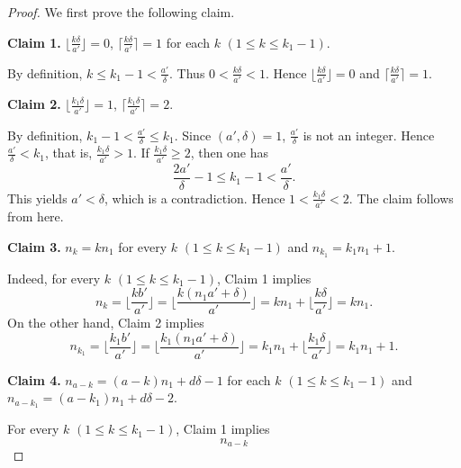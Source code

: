 \documentclass[12pt]{amsart}
\theoremstyle{definition}
\theoremstyle{remark}
\numberwithin{equation}{section}
\begin{document}
\begin{proof}
We first prove the following claim. 
\par \vspace{2mm} \par \noindent 
{\bf Claim 1.} $\lfloor \frac{k\delta}{a'}\rfloor=0$, 
$\lceil \frac{k\delta}{a'}\rceil=1$  for each $k$ $(1 \le k \le k_1-1)$. 
\par \vspace{2mm}
By definition, $k \le k_1-1< \frac{a'}{\delta}$. 
Thus $0 < \frac{k\delta}{a'} < 1$. 
Hence $\lfloor \frac{k\delta}{a'}\rfloor=0$ and 
$\lceil \frac{k\delta}{a'}\rceil=1$. 
\par \vspace{2mm} \par \noindent 
{\bf Claim 2.} $\lfloor \frac{k_1\delta}{a'}\rfloor=1$, 
$\lceil \frac{k_1\delta}{a'}\rceil=2$. 
\par \vspace{2mm}
By definition, $k_1-1 < \frac{a'}{\delta} \le k_1$. 
Since $(a',\delta)=1$, $\frac{a'}{\delta}$ is not an integer. 
Hence $\frac{a'}{\delta}< k_1$, that is, $\frac{k_1\delta}{a'} > 1$. 
If $\frac{k_1\delta}{a'} \ge 2$, then one has 
\[
\frac{2a'}{\delta}-1 \le k_1-1 < \frac{a'}{\delta}.  
\]
This yields $a' < \delta$, which is a contradiction. 
Hence $1 < \frac{k_1\delta}{a'}< 2$. 
The claim follows from here. 
\par \vspace{2mm} \par \noindent 
{\bf Claim 3.} $n_k=kn_1$ for every $k$ $(1 \le k \le k_1-1)$ and 
$n_{k_1}=k_1n_1+1$. 
\par \vspace{2mm} 
Indeed, for every $k$ $(1 \le k \le k_1-1)$, Claim 1 implies 
\[
n_k= \lfloor \frac{kb'}{a'} \rfloor = \lfloor \frac{k(n_1a'+\delta)}{a'}\rfloor
=kn_1+\lfloor \frac{k\delta}{a'}\rfloor=kn_1.
\]
On the other hand, Claim 2 implies 
\[
n_{k_1}=\lfloor \frac{k_1b'}{a'}\rfloor
=\lfloor \frac{k_1(n_1a'+\delta)}{a'}\rfloor
=k_1n_1+ \lfloor \frac{k_1\delta}{a'}\rfloor
=k_1n_1+1. 
\]
\par \vspace{2mm} \par \noindent 
{\bf Claim 4.} $n_{a-k}=(a-k)n_1+d\delta-1$ 
for each $k$ $(1 \le k \le k_1-1)$ and 
$n_{a-k_1}=(a-k_1)n_1+d\delta-2$. 
\par \vspace{2mm}
For every $k$ $(1 \le k \le k_1-1)$, Claim 1 implies 
\[
n_{a-k} 
\]
\end{proof}
\end{document}
